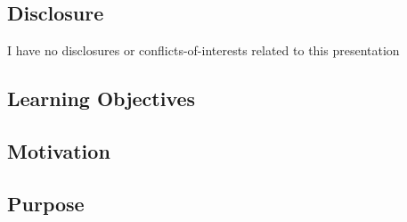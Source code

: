 \documentclass[
      american,
      12pt,
      letterpaper,
    ]{article}
\begin{document}
\subsection{Disclosure}\label{disclosure}

I have no disclosures or conflicts-of-interests related to this
presentation

\subsection{Learning Objectives}\label{learning-objectives}

\subsection{Motivation}\label{motivation}

\subsection{Purpose}\label{purpose}
\end{document}
